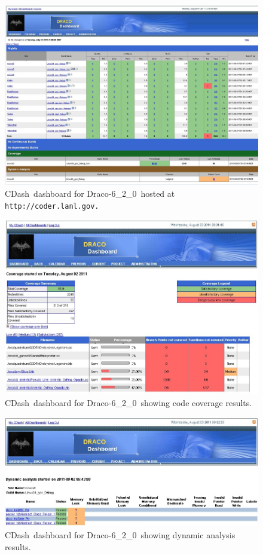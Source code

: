 \documentclass[note]{ResearchNote_pdf}
\newcommand{\draco}{Draco}
\newcommand{\dracor}{\draco-6\_2\_0}
\newcommand{\cdash}{\textsf{CDash}}
\begin{document}
\begin{figure}
  \label{fig:dashboard}
  \centerline{
    \includegraphics[width=8.0in,angle=90]{dashboard-620.jpg}}
  \caption{\cdash\ dashboard for \dracor\ hosted at \texttt{http://coder.lanl.gov.}}
\end{figure}
\begin{figure}
  \label{fig:ccdashboard}
  \centerline{
    \includegraphics[width=6.0in,angle=0]{dashboard-cc-620.jpg}}
  \caption{\cdash\ dashboard for \dracor\ showing code coverage results.}
\end{figure}
\begin{figure}
  \label{fig:vgdashboard}
  \centerline{
    \includegraphics[width=6.0in,angle=0]{dashboard-valgrind-620.jpg}}
  \caption{\cdash\ dashboard for \dracor\ showing dynamic analysis results.}
\end{figure}
\end{document}
